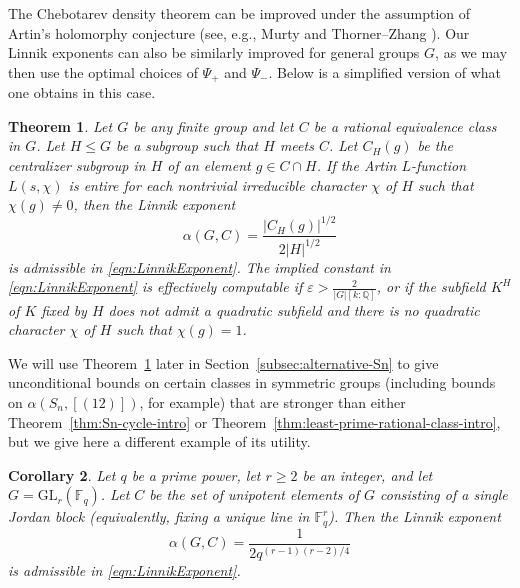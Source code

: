 \documentclass[12pt]{amsart}
\newtheorem{theorem}{Theorem}
\newtheorem{corollary}[theorem]{Corollary}
\theoremstyle{definition} \newtheorem{definition}[theorem]{Definition}
\theoremstyle{example} \newtheorem{example}[theorem]{Example}
\theoremstyle{remark} \newtheorem{remark}{Remark}[theorem]
\numberwithin{equation}{section}
\numberwithin{theorem}{section}
\renewcommand{\epsilon}{\varepsilon}
\renewcommand{\leq}{\leqslant}
\renewcommand{\geq}{\geqslant}
\begin{document}
	The Chebotarev density theorem can be improved under the assumption of Artin's holomorphy conjecture (see, e.g., Murty \cite{Murty-ChebotarevII} and Thorner--Zhang \cite{ThornerZhang}). Our Linnik exponents can also be similarly improved for general groups $G$, as we may then use the optimal choices of $\Psi_+$ and $\Psi_-$. Below is a simplified version of what one obtains in this case. 

	\begin{theorem}\label{thm:least-prime-rational-class-artin-intro}
	Let $G$ be any finite group and let $C$ be a rational equivalence class in $G$. Let $H \leq G$ be a subgroup such that $H$ meets $C$. Let $C_H(g)$ be the centralizer subgroup in $H$ of an element $g \in C \cap H$. If the Artin $L$-function $L(s,\chi)$ is entire for each nontrivial irreducible character $\chi$ of $H$ such that $\chi(g) \ne 0$, then the Linnik exponent
		\[
			\alpha(G,C) = \frac{|C_H(g)|^{1/2}}{2|H|^{1/2}}
		\]
	is admissible in \eqref{eqn:LinnikExponent}.  The implied constant in \eqref{eqn:LinnikExponent} is effectively computable if $\epsilon > \frac{2}{
	|G|[k:\mathbb{Q}]}$, or if the subfield $K^H$ of $K$ fixed by $H$ does not admit a quadratic subfield and there is no quadratic character $\chi$ of $H$ such that $\chi(g) = 1$.
	\end{theorem}	

	We will use Theorem~\ref{thm:least-prime-rational-class-artin-intro} later in Section~\ref{subsec:alternative-Sn} to give unconditional bounds on certain classes in symmetric groups (including bounds on $\alpha(S_n, [(12)])$, for example) that are stronger than either Theorem~\ref{thm:Sn-cycle-intro} or Theorem~\ref{thm:least-prime-rational-class-intro}, but we give here a different example of its utility.
	
	\begin{corollary}
		\label{cor:unipotent}
		Let $q$ be a prime power, let $r \geq 2$ be an integer, and let $G = \mathrm{GL}_r(\mathbb{F}_q)$.  Let $C$ be the set of unipotent elements of $G$ consisting of a single Jordan block (equivalently, fixing a unique line in $\mathbb{F}_q^r$).  Then the Linnik exponent
			\[
				\alpha(G,C) = \frac{1}{2q^{(r-1)(r-2)/4}}
			\]
		is admissible in \eqref{eqn:LinnikExponent}. 
	\end{corollary}
	
\end{document}
